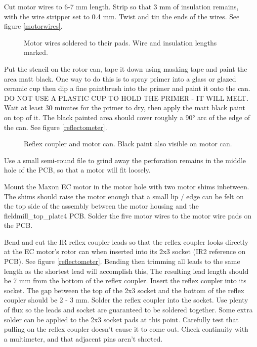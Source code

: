 \documentclass{article}
\begin{document}
Cut motor wires to 6-7 mm length.
Strip so that 3 mm of insulation remains, with the wire stripper set to 0.4 mm.
Twist and tin the ends of the wires. See figure \vref{motorwires}.

\begin{figure}
\centering
\caption{Motor wires soldered to their pads. Wire and insulation lengths marked.}
\label{motorwires}
\end{figure}

Put the stencil on the rotor can, tape it down using masking tape and paint the area matt black.
One way to do this is to spray primer into a glass or glazed ceramic cup then dip a fine paintbrush into the primer and paint it onto the can.
DO NOT USE A PLASTIC CUP TO HOLD THE PRIMER - IT WILL MELT.
Wait at least 30 minutes for the primer to dry, then apply the matt black paint on top of it.
The black painted area should cover roughly a 90° arc of the edge of the can.
See figure \vref{reflectometer}.

\begin{figure}
\centering
\caption{Reflex coupler and motor can. Black paint also visible on motor can.}
\label{reflectometer}
\end{figure}

Use a small semi-round file to grind away the perforation remains in the middle hole of the PCB,
so that a motor will fit loosely.

Mount the Maxon EC motor in the motor hole with two motor shims inbetween.
The shims should raise the motor enough that a small lip / edge can be felt on the top side of the assembly between the motor housing and the fieldmill\_top\_plate4 PCB.
Solder the five motor wires to the motor wire pads on the PCB.

Bend and cut the IR reflex coupler leads so that the reflex coupler looks directly at the EC motor's rotor can when inserted into its 2x3 socket (IR2 reference on PCB). See figure \vref{reflectometer}.
Bending then trimming all leads to the same length as the shortest lead will accomplish this,
The resulting lead length should be 7 mm from the bottom of the reflex coupler.
Insert the reflex coupler into its socket.
The gap between the top of the 2x3 socket and the bottom of the reflex coupler should be 2 - 3 mm.
Solder the reflex coupler into the socket. Use plenty of flux so the leads and socket are guaranteed to be soldered together.
Some extra solder can be applied to the 2x3 socket pads at this point.
Carefully test that pulling on the reflex coupler doesn't cause it to come out.
Check continuity with a multimeter, and that adjacent pins aren't shorted.
\end{document}
